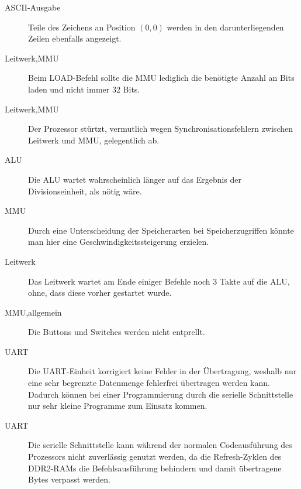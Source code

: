\begin{description}
\item[ASCII-Ausgabe] Teile des Zeichens an Position \((0,0)\) werden in den
darunterliegenden Zeilen ebenfalls angezeigt.
\item[Leitwerk,MMU] Beim LOAD-Befehl sollte die MMU lediglich die ben\"otigte
Anzahl an Bits laden und nicht immer 32 Bits.
\item[Leitwerk,MMU] Der Prozessor st\"urtzt, vermutlich wegen
Synchronisationsfehlern zwischen Leitwerk und MMU, gelegentlich ab.
\item[ALU] Die ALU wartet wahrscheinlich l\"anger auf das Ergebnis der
Divisionseinheit, als n\"otig w\"are.
\item[MMU] Durch eine Unterscheidung der Speicherarten bei Speicherzugriffen
k\"onnte man hier eine Geschwindigkeitssteigerung erzielen.
\item[Leitwerk] Das Leitwerk wartet am Ende einiger Befehle noch 3 Takte auf
die ALU, ohne, dass diese vorher gestartet wurde.
\item[MMU,allgemein] Die Buttons und Switches werden nicht entprellt.
\item[UART] Die UART-Einheit korrigiert keine Fehler in der \"Ubertragung,
weshalb nur eine sehr begrenzte Datenmenge fehlerfrei \"ubertragen werden kann.
Dadurch k\"onnen bei einer Programmierung durch die serielle Schnittstelle nur
sehr kleine Programme zum Einsatz kommen.
\item[UART] Die serielle Schnittstelle kann w\"ahrend der normalen
Codeausf\"uhrung des Prozessors nicht zuverl\"assig genutzt werden, da die
Refresh-Zyklen des DDR2-RAMs die Befehlsausf\"uhrung behindern und damit
\"ubertragene Bytes verpasst werden.
\end{description}
